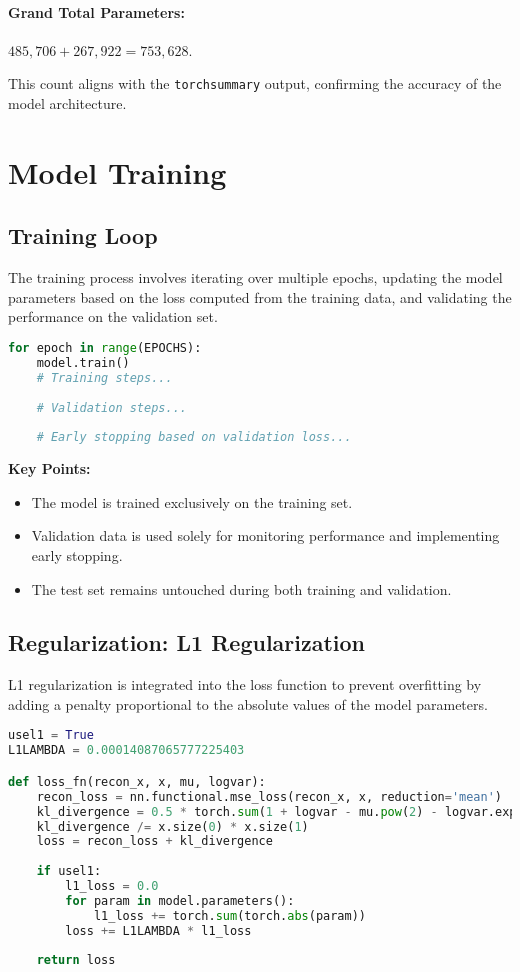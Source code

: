 \documentclass[10pt]{article}
\begin{document}
\paragraph{Grand Total Parameters:} \( 485,706 + 267,922 = 753,628 \).

This count aligns with the \texttt{torchsummary} output, confirming the accuracy of the model architecture.

\section{Model Training}

\subsection{Training Loop}
The training process involves iterating over multiple epochs, updating the model parameters based on the loss computed from the training data, and validating the performance on the validation set.

\begin{lstlisting}[language=Python, caption=Training Loop]
for epoch in range(EPOCHS):
    model.train()
    # Training steps...
    
    # Validation steps...
    
    # Early stopping based on validation loss...
\end{lstlisting}

\textbf{Key Points:}
\begin{itemize}
    \item The model is trained exclusively on the training set.
    \item Validation data is used solely for monitoring performance and implementing early stopping.
    \item The test set remains untouched during both training and validation.
\end{itemize}

\subsection{Regularization: L1 Regularization}
L1 regularization is integrated into the loss function to prevent overfitting by adding a penalty proportional to the absolute values of the model parameters.

\begin{lstlisting}[language=Python, caption=L1 Regularization in Loss Function]
usel1 = True
L1LAMBDA = 0.00014087065777225403

def loss_fn(recon_x, x, mu, logvar):
    recon_loss = nn.functional.mse_loss(recon_x, x, reduction='mean')
    kl_divergence = 0.5 * torch.sum(1 + logvar - mu.pow(2) - logvar.exp())
    kl_divergence /= x.size(0) * x.size(1)
    loss = recon_loss + kl_divergence
    
    if usel1:
        l1_loss = 0.0
        for param in model.parameters():
            l1_loss += torch.sum(torch.abs(param))
        loss += L1LAMBDA * l1_loss
    
    return loss
\end{lstlisting}
\end{document}
